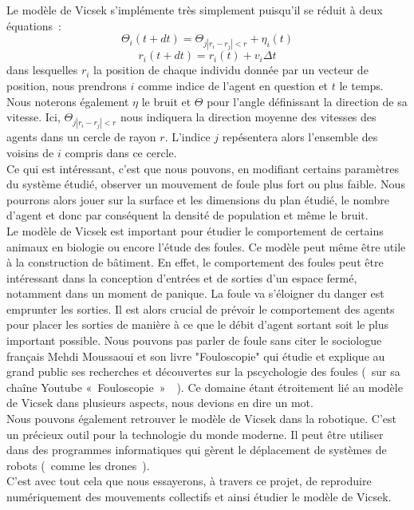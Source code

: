 \documentclass[french, a4paper, 12pt]{article}
\begin{document}
	Le modèle de Vicsek s'implémente très simplement puisqu'il se réduit à deux équations~:
	\[
		\Theta_{i}(t+dt) = \Theta_{j |r_{i}-r_{j}|<r} + \eta_{i}(t)
	\]
	\[
		r_{i}(t+dt) = r_{i}(t) + v_{i}\Delta t
	\]
	dans lesquelles $r_{i}$ la position de chaque individu donnée par un vecteur de position, nous prendrons $i$ comme indice de l'agent en question et $t$ le temps. Nous noterons également $\eta$ le bruit et $\Theta$ pour l’angle définissant la direction de sa vitesse. Ici, $\Theta_{j |r_{i}-r_{j}|<r}$ nous indiquera la direction moyenne des vitesses des agents dans un cercle de rayon $r$. L'indice $j$ repésentera alors l'ensemble des voisins de $i$ compris dans ce cercle.\\

	Ce qui est intéressant, c'est que nous pouvons, en modifiant certains paramètres du système étudié, observer un mouvement de foule plus fort ou plus faible. Nous pourrons alors jouer sur la surface et les dimensions du plan étudié, le nombre d'agent et donc par conséquent la densité de population et même le bruit.\\

	Le modèle de Vicsek est important pour étudier le comportement de certains animaux en biologie ou encore l'étude des foules. Ce modèle peut même être utile à la construction de bâtiment. En effet, le comportement des foules peut être intéressant dans la conception d'entrées et de sorties d'un espace fermé, notamment dans un moment de panique. La foule va s'éloigner du danger est emprunter les sorties. Il est alors crucial de prévoir le comportement des agents pour placer les sorties de manière à ce que le débit d'agent sortant soit le plus important possible. Nous pouvons pas parler de foule sans citer le sociologue français Mehdi Moussaoui et son livre "Fouloscopie" qui étudie et explique au grand public ses recherches et découvertes sur la pscychologie des foules (~sur sa chaîne Youtube «~Fouloscopie~»~\cite{fouloscopie}~). Ce domaine étant étroitement lié au modèle de Vicsek dans plusieurs aspects, nous devions en dire un mot. \\

	Nous pouvons également retrouver le modèle de Vicsek dans la robotique. C'est un précieux outil pour la technologie du monde moderne. Il peut être utiliser dans des programmes informatiques qui gèrent le déplacement de systèmes de robots (~comme les drones~).\\ 

	C'est avec tout cela que nous essayerons, à travers ce projet, de reproduire numériquement des mouvements collectifs et ainsi étudier le modèle de Vicsek.
\end{document}
